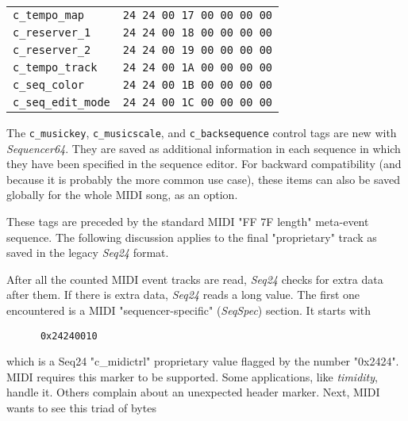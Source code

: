 \begin{table}[htb]
\begin{tabular}{l l}
         \texttt{c\_tempo\_map}     & \texttt{24 24 00 17 00 00 00 00} \\
         \texttt{c\_reserver\_1}    & \texttt{24 24 00 18 00 00 00 00} \\
         \texttt{c\_reserver\_2}    & \texttt{24 24 00 19 00 00 00 00} \\
         \texttt{c\_tempo\_track}   & \texttt{24 24 00 1A 00 00 00 00} \\
         \texttt{c\_seq\_color}     & \texttt{24 24 00 1B 00 00 00 00} \\
         \texttt{c\_seq\_edit\_mode} & \texttt{24 24 00 1C 00 00 00 00} \\
      \end{tabular}
   \end{table}

   The \texttt{c\_musickey},
   \texttt{c\_musicscale}, and
   \texttt{c\_backsequence}
   control tags are new with \textsl{Sequencer64}.
   They are saved as additional information in each sequence in which they
   have been specified in the sequence editor.
   For backward compatibility (and because it is probably the more
   common use case), these items can also be
   saved globally for the whole MIDI song, as an option.

   These tags
   are preceded by the standard MIDI "FF 7F length" meta-event sequence.
   The following discussion applies to the final "proprietary" track as
   saved in the legacy \textsl{Seq24} format.

   After all the counted MIDI event
   tracks are read, \textsl{Seq24} checks for
   extra data after them.
   If there is extra data, \textsl{Seq24} reads a long value.
   The first one encountered is a MIDI "sequencer-specific"
   (\textsl{SeqSpec}) section.  It starts with

   \begin{verbatim}
      0x24240010
   \end{verbatim}

   which is a Seq24 "c\_midictrl" proprietary value flagged by the
   number "0x2424".
   MIDI requires this marker to be supported.  Some applications, like
   \textsl{timidity}, handle it.  Others %
   complain about an unexpected header marker.
   Next, MIDI wants to see this triad of bytes

